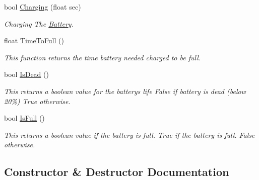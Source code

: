 \begin{DoxyCompactItemize}
bool \hyperlink{classcsci3081_1_1Battery_add69602a44edb56918384d3c24888e20}{Charging} (float sec)
\begin{DoxyCompactList}\small\item\em Charging The \hyperlink{classcsci3081_1_1Battery}{Battery}. \end{DoxyCompactList}\item 
\mbox{\label{classcsci3081_1_1Battery_a03b38835791a378ac3374efbb3993eb4}} 
float \hyperlink{classcsci3081_1_1Battery_a03b38835791a378ac3374efbb3993eb4}{Time\+To\+Full} ()
\begin{DoxyCompactList}\small\item\em This function returns the time battery needed charged to be full. \end{DoxyCompactList}\item 
\mbox{\label{classcsci3081_1_1Battery_a76a8b9485a8b901eed3e45cb738380cc}} 
bool \hyperlink{classcsci3081_1_1Battery_a76a8b9485a8b901eed3e45cb738380cc}{Is\+Dead} ()
\begin{DoxyCompactList}\small\item\em This returns a boolean value for the battery\textquotesingle{}s life False if battery is dead (below 20\%) True otherwise. \end{DoxyCompactList}\item 
\mbox{\label{classcsci3081_1_1Battery_a04760ee4be9a947c7478e7da48e2f75e}} 
bool \hyperlink{classcsci3081_1_1Battery_a04760ee4be9a947c7478e7da48e2f75e}{Is\+Full} ()
\begin{DoxyCompactList}\small\item\em This returns a boolean value if the battery is full. True if the battery is full. False otherwise. \end{DoxyCompactList}\end{DoxyCompactItemize}


\subsection{Constructor \& Destructor Documentation}
\mbox{\label{classcsci3081_1_1Battery_a523da2c50bea66ea0d4aa49a7688a385}} 
